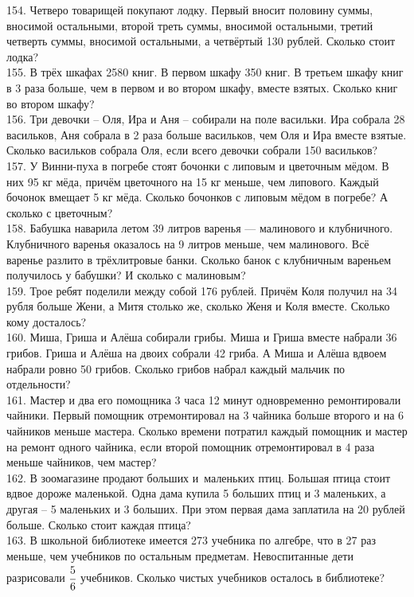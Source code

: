 \documentclass[12pt]{article}
\begin{document}
154. Четверо товарищей покупают лодку. Первый вносит половину суммы, вносимой остальными, второй треть суммы, вносимой остальными, третий четверть суммы, вносимой остальными, а четвёртый 130 рублей. Сколько стоит лодка?\\
155. В трёх шкафах 2580 книг. В первом шкафу 350 книг. В третьем шкафу книг в 3 раза  больше, чем в первом и во втором шкафу, вместе взятых. Сколько книг во втором шкафу?\\
156. Три девочки – Оля, Ира и Аня – собирали на поле васильки. Ира собрала 28 васильков, Аня собрала в 2 раза больше васильков, чем Оля и Ира вместе взятые. Сколько васильков собрала Оля, если всего девочки собрали 150 васильков?\\
157. У Винни-пуха в погребе стоят бочонки с липовым и цветочным мёдом. В них 95 кг мёда, причём цветочного на 15 кг меньше, чем липового. Каждый бочонок вмещает 5 кг мёда. Сколько бочонков с липовым мёдом в погребе? А сколько с цветочным?\\
158. Бабушка наварила летом 39 литров варенья --- малинового и клубничного. Клубничного варенья оказалось на 9 литров меньше, чем малинового. Всё варенье разлито в трёхлитровые банки. Сколько банок с клубничным вареньем получилось у бабушки? И сколько с малиновым?\\
159. Трое ребят поделили между собой 176 рублей. Причём Коля получил на 34 рубля больше Жени, а Митя столько же, сколько Женя и Коля вместе. Сколько кому досталось?\\
160. Миша, Гриша и Алёша собирали грибы. Миша и Гриша вместе набрали 36 грибов. Гриша и Алёша на двоих собрали 42 гриба. А Миша и Алёша вдвоем набрали ровно 50 грибов. Сколько грибов набрал каждый мальчик по отдельности?\\
161. Мастер и два его помощника 3 часа 12 минут одновременно ремонтировали чайники. Первый помощник отремонтировал на 3 чайника больше второго и на 6 чайников меньше мастера. Сколько времени потратил каждый помощник и мастер на ремонт одного чайника, если второй помощник отремонтировал в 4 раза меньше чайников, чем мастер?\\
162. В зоомагазине продают больших и маленьких птиц. Большая птица стоит вдвое дороже маленькой. Одна дама купила 5 больших птиц и 3 маленьких, а другая – 5 маленьких и 3 больших. При этом первая дама заплатила на 20 рублей больше. Сколько стоит каждая птица?\\
163. В школьной библиотеке имеется 273 учебника по алгебре, что в 27 раз меньше, чем учебников по остальным предметам. Невоспитанные дети разрисовали $\cfrac{5}{6}$  учебников. Сколько чистых учебников осталось в библиотеке?\\
\end{document}
